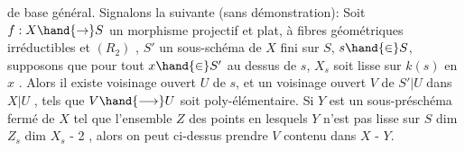 
de base général. Signalons la suivante (sans démonstration): Soit $f:X\hand{\to} S$
un morphisme projectif et plat,  à fibres géométriques
 irréductibles et $(R_2)$ , $S'$ un sous-schéma de $X$ fini sur $S$,
$s\hand{\in} S$, supposons que pour tout $x\hand{\in} S'$ au dessus de $s$, $X_s$ soit lisse sur
$k(s)$ en $x$ . Alors il existe  voisinage ouvert $U$ de $s$, et un voisinage
ouvert $V$ de $S'|U$ dans $X|U$ , tels que $V\hand{\longrightarrow} U$ soit poly-élémentaire.
Si $Y$ est un sous-préschéma fermé de $X$ tel que l'ensemble $Z$ des points
en lesquels $Y$ n'est pas lisse sur $S$   
dim $Z_s$ \hand{$\leq$} dim $X_s$ - 2 , alors on peut ci-dessus prendre $V$ contenu dans
$X$ - $Y$.

